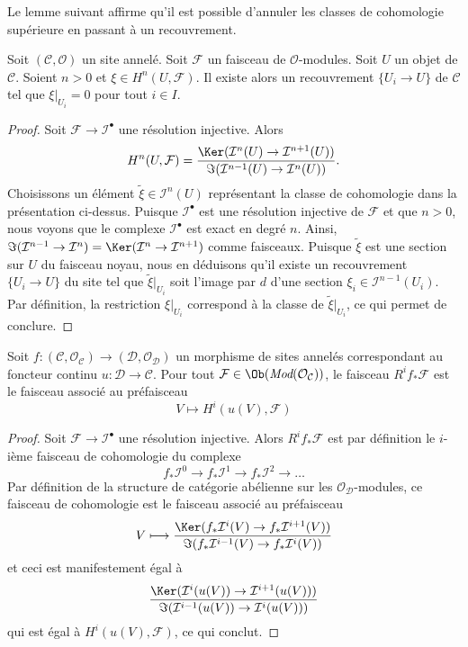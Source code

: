 \medskip\noindent
Le lemme suivant affirme qu'il est possible d'annuler les classes de cohomologie
supérieure en passant à un recouvrement.

\begin{lemma}
\label{lemma-kill-cohomology-class-on-covering}
Soit $(\mathcal{C}, \mathcal{O})$ un site annelé.
Soit $\mathcal{F}$ un faisceau de $\mathcal{O}$-modules.
Soit $U$ un objet de $\mathcal{C}$.
Soient $n > 0$ et $\xi \in H^n(U, \mathcal{F})$.
Il existe alors un recouvrement $\{U_i \to U\}$ de $\mathcal{C}$
tel que $\xi|_{U_i} = 0$ pour tout $i \in I$.
\end{lemma}

\begin{proof}
Soit $\mathcal{F} \to \mathcal{I}^\bullet$ une résolution injective.
Alors
$$
H^n(U, \mathcal{F}) =
\frac{\Ker(\mathcal{I}^n(U) \to \mathcal{I}^{n + 1}(U))}
{\Im(\mathcal{I}^{n - 1}(U) \to \mathcal{I}^n(U))}.
$$
Choisissons un élément $\tilde \xi \in \mathcal{I}^n(U)$ représentant la
classe de cohomologie dans la présentation ci-dessus. Puisque $\mathcal{I}^\bullet$
est une résolution injective de $\mathcal{F}$ et que $n > 0$, nous voyons que
le complexe $\mathcal{I}^\bullet$ est exact en degré $n$. Ainsi,
$\Im(\mathcal{I}^{n - 1} \to \mathcal{I}^n) =
\Ker(\mathcal{I}^n \to \mathcal{I}^{n + 1})$ comme faisceaux.
Puisque $\tilde \xi$ est une section sur $U$ du faisceau noyau,
nous en déduisons qu'il existe un recouvrement $\{U_i \to U\}$ du site
tel que $\tilde \xi|_{U_i}$ soit l'image par $d$ d'une section
$\xi_i \in \mathcal{I}^{n - 1}(U_i)$. Par définition, la
restriction $\xi|_{U_i}$ correspond à la classe de
$\tilde \xi|_{U_i}$, ce qui permet de conclure.
\end{proof}

\begin{lemma}
\label{lemma-higher-direct-images}
Soit $f : (\mathcal{C}, \mathcal{O}_\mathcal{C}) \to
(\mathcal{D}, \mathcal{O}_\mathcal{D})$ un morphisme de sites annelés
correspondant au foncteur continu $u : \mathcal{D} \to \mathcal{C}$.
Pour tout $\mathcal{F} \in \Ob(\textit{Mod}(\mathcal{O}_\mathcal{C}))$,
le faisceau $R^if_*\mathcal{F}$ est le faisceau associé au
préfaisceau
$$
V \longmapsto H^i(u(V), \mathcal{F})
$$
\end{lemma}

\begin{proof}
Soit $\mathcal{F} \to \mathcal{I}^\bullet$ une résolution injective.
Alors $R^if_*\mathcal{F}$ est par définition le $i$-ième faisceau de cohomologie
du complexe
$$
f_*\mathcal{I}^0 \to f_*\mathcal{I}^1 \to f_*\mathcal{I}^2 \to \ldots
$$
Par définition de la structure de catégorie abélienne sur les
$\mathcal{O}_\mathcal{D}$-modules,
ce faisceau de cohomologie est le faisceau associé au préfaisceau
$$
V
\longmapsto
\frac{\Ker(f_*\mathcal{I}^i(V) \to f_*\mathcal{I}^{i + 1}(V))}
{\Im(f_*\mathcal{I}^{i - 1}(V) \to f_*\mathcal{I}^i(V))}
$$
et ceci est manifestement égal à
$$
\frac{\Ker(\mathcal{I}^i(u(V)) \to \mathcal{I}^{i + 1}(u(V)))}
{\Im(\mathcal{I}^{i - 1}(u(V)) \to \mathcal{I}^i(u(V)))}
$$
qui est égal à $H^i(u(V), \mathcal{F})$,
ce qui conclut.
\end{proof}






